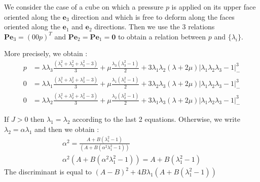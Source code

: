 \documentclass[a4paper,11pt]{article}
\newcommand{\fpk}{{\mathbf P}}
\newcommand{\dir}{\mathbf{e}}
\begin{document}
We consider the case of a cube on which a pressure $p$ is applied on its upper face oriented along the $\dir_3$ direction and which is free to deform along the faces oriented along the $\dir_1$ and $\dir_2$ directions. Then we use the 3 relations $\fpk \dir_3=(0 0 p)^T$ and $\fpk \dir_2 =\fpk \dir_1 = {\mathbf 0}$ to obtain a relation between $p$ and $\{\lambda_i\}$. 

More precisely, we obtain :
\begin{align*}
p&=\lambda \lambda_3 \frac{(\lambda_1^2+\lambda_2^2+\lambda_3^2-3)}{3} +\mu \frac{\lambda_3 (\lambda_3^2-1)}{2}+3\lambda_1 \lambda_2  (\lambda+2\mu) |\lambda_1 \lambda_2 \lambda_3-1|^3_{-}\\
0&=\lambda \lambda_1 \frac{(\lambda_1^2+\lambda_2^2+\lambda_3^2-3)}{3} +\mu \frac{\lambda_1 (\lambda_1^2-1)}{2}+3\lambda_2 \lambda_3  (\lambda+2\mu) |\lambda_1 \lambda_2 \lambda_3-1|^3_{-}\\
0&=\lambda \lambda_2 \frac{(\lambda_1^2+\lambda_2^2+\lambda_3^2-3)}{3} +\mu \frac{\lambda_2 (\lambda_2^2-1)}{2}+3\lambda_1 \lambda_3  (\lambda+2\mu) |\lambda_1 \lambda_2 \lambda_3-1|^3_{-}
\end{align*}

If $J>0$ then $\lambda_1=\lambda_2$ according to the last 2 equations. Otherwise, we write $\lambda_2=\alpha \lambda_1$ and then we obtain :
\begin{align*}
 \alpha^2 = \frac{A+B(\lambda_1^2-1)}{ (A+B(\alpha^2\lambda_1^2-1))} \\
 \alpha^2 (A+B(\alpha^2\lambda_1^2-1)) = A+B(\lambda_1^2-1)
\end{align*}
The discriminant is equal to $(A-B)^2+4B\lambda_1(A+B(\lambda_1^2-1))$
\end{document}

